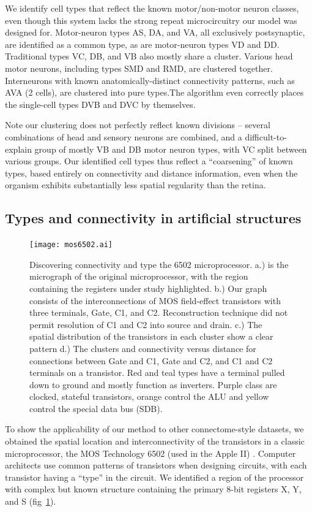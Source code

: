 \documentclass{article}
\begin{document}
We identify cell types that reflect the known motor/non-motor neuron
classes, even though this system lacks the strong repeat
microcircuitry our model was designed for.  Motor-neuron types AS, DA,
and VA, all exclusively postsynaptic, are identified as a common type,
as are motor-neuron types VD and DD. Traditional types VC, DB, and VB
also mostly share a cluster. Various head motor neurons, including
types SMD and RMD, are clustered together. Interneurons with known
anatomically-distinct connectivity patterns, such as AVA (2 cells),
are clustered into pure types.The algorithm even correctly places the
single-cell types DVB and DVC by themselves.

Note our clustering does not perfectly reflect known divisions --
several combinations of head and sensory neurons are combined, and a
difficult-to-explain group of mostly VB and DB motor neuron types,
with VC split between various groups. Our identified cell types thus
reflect a ``coarsening'' of known types, based entirely on
connectivity and distance information, even when the organism exhibits
substantially less spatial regularity than the retina.


\subsection*{Types and connectivity in artificial structures}
\begin{figure}
  \centering 
  \centerline{\texttt{[image: mos6502.ai]}}
  \caption{Discovering connectivity and type the 6502 microprocessor.
    a.) is the micrograph of the original microprocessor, with the
    region containing the registers under study highlighted. b.) Our
    graph consists of the interconnections of MOS field-effect
    transistors with three terminals, Gate, C1, and C2. Reconstruction
    technique did not permit resolution of C1 and C2 into source and
    drain. c.) The spatial distribution of the transistors in each
    cluster show a clear pattern d.) The clusters and connectivity
    versus distance for connections between Gate and C1, Gate and C2,
    and C1 and C2 terminals on a transistor. Red and teal types have a
    terminal pulled down to ground and mostly function as
    inverters. Purple class are clocked, stateful transistors, orange
    control the ALU and yellow control the special data bus (SDB).}
  \label{fig:mos6502}
\end{figure}


To show the applicability of our method to other connectome-style
datasets, we obtained the spatial location and interconnectivity of
the transistors in a classic microprocessor, the MOS Technology 6502
(used in the Apple II) \autocite{James2010}. Computer architects use
common patterns of transistors when designing circuits, with each
transistor having a ``type'' in the circuit. We identified a region of
the processor with complex but known structure containing the primary
8-bit registers X, Y, and S (fig~\ref{fig:mos6502}).
\end{document}
